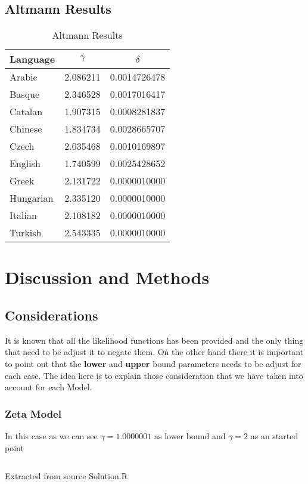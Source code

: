 \documentclass[12pt, a4paper]{article}
\begin{document}
\subsection{Altmann Results}
\begin{table}[H]
    \centering
        \begin{tabular}{l c c}
        Language & $\gamma$ & $\delta$ \\
         \hline
         Arabic    & 2.086211 & 0.0014726478 \\
         Basque    & 2.346528 & 0.0017016417 \\
         Catalan   & 1.907315 & 0.0008281837 \\
         Chinese   & 1.834734 & 0.0028665707 \\
         Czech     & 2.035468 & 0.0010169897 \\
         English   & 1.740599 & 0.0025428652 \\
         Greek     & 2.131722 & 0.0000010000 \\
         Hungarian & 2.335120 & 0.0000010000 \\
         Italian   & 2.108182 & 0.0000010000 \\
         Turkish   & 2.543335 & 0.0000010000 
        \end{tabular}
       \caption{Altmann Results}
       \label{table:5}
    \end{table}

\section{Discussion and Methods}
\subsection{Considerations}
It is known that all the likelihood functions has been provided and the only thing that need to be adjust it to negate them.
On the other hand there it is important to point out that the \textbf{lower} and \textbf{upper} bound parameters needs to be adjust for each case.
The idea here is to explain those consideration that we have taken into account for each Model.

\subsubsection{Zeta Model}
In this case as we can see $\gamma = 1.0000001$ as lower bound and $\gamma = 2$ as an started point
\begin{listing}[H]
    \inputminted[firstline=59, lastline=67, breaklines]{R}{./Solution.R}
    \caption{Extracted from source Solution.R}
    \label{apx:src:2}
\end{listing}  
\end{document}
